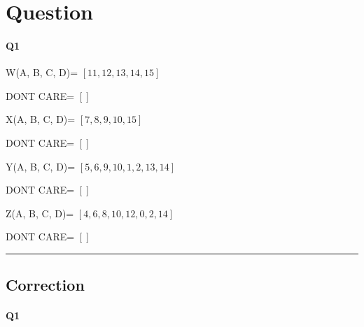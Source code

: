 
\section{Question}


\paragraph{Q1}


W(A, B, C, D)= $[11, 12, 13, 14, 15]$

DONT CARE= $[]$

X(A, B, C, D)= $[7, 8, 9, 10, 15]$

DONT CARE= $[]$

Y(A, B, C, D)= $[5, 6, 9, 10, 1, 2, 13, 14]$

DONT CARE= $[]$

Z(A, B, C, D)= $[4, 6, 8, 10, 12, 0, 2, 14]$

DONT CARE= $[]$



\hrule width 1\linewidth
\pagebreak

\subsection{Correction}


\paragraph{Q1}

